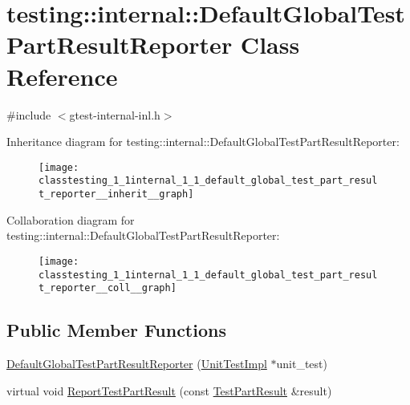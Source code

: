 \hypertarget{classtesting_1_1internal_1_1_default_global_test_part_result_reporter}{}\section{testing\+:\+:internal\+:\+:Default\+Global\+Test\+Part\+Result\+Reporter Class Reference}
\label{classtesting_1_1internal_1_1_default_global_test_part_result_reporter}


{\ttfamily \#include $<$gtest-\/internal-\/inl.\+h$>$}



Inheritance diagram for testing\+:\+:internal\+:\+:Default\+Global\+Test\+Part\+Result\+Reporter\+:
\nopagebreak
\begin{figure}[H]
\begin{center}
\leavevmode
\texttt{[image: classtesting\_1\_1internal\_1\_1\_default\_global\_test\_part\_result\_reporter\_\_inherit\_\_graph]}
\end{center}
\end{figure}


Collaboration diagram for testing\+:\+:internal\+:\+:Default\+Global\+Test\+Part\+Result\+Reporter\+:
\nopagebreak
\begin{figure}[H]
\begin{center}
\leavevmode
\texttt{[image: classtesting\_1\_1internal\_1\_1\_default\_global\_test\_part\_result\_reporter\_\_coll\_\_graph]}
\end{center}
\end{figure}
\subsection*{Public Member Functions}
\begin{DoxyCompactItemize}
\item 
\hyperlink{classtesting_1_1internal_1_1_default_global_test_part_result_reporter_a3900ea7f34b34afd48c7d1d0312a1488}{Default\+Global\+Test\+Part\+Result\+Reporter} (\hyperlink{classtesting_1_1internal_1_1_unit_test_impl}{Unit\+Test\+Impl} $\ast$unit\+\_\+test)
\item 
virtual void \hyperlink{classtesting_1_1internal_1_1_default_global_test_part_result_reporter_a6081576a23b964cfecab1e424d8044fc}{Report\+Test\+Part\+Result} (const \hyperlink{classtesting_1_1_test_part_result}{Test\+Part\+Result} \&result)
\end{DoxyCompactItemize}


